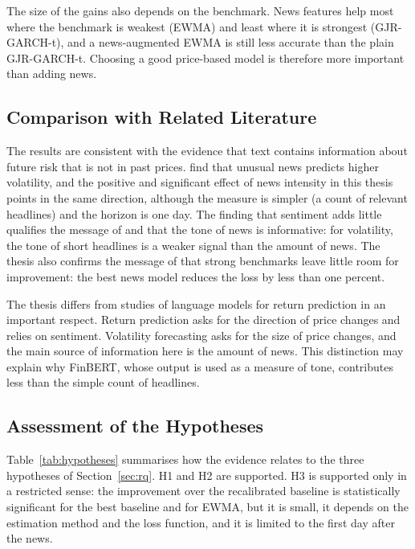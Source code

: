 \documentclass[12pt,a4paper]{article}
\begin{document}
The size of the gains also depends on the benchmark. News features help most where the benchmark is weakest (EWMA) and least where it is strongest (GJR-GARCH-t), and a news-augmented EWMA is still less accurate than the plain GJR-GARCH-t. Choosing a good price-based model is therefore more important than adding news.

\subsection{Comparison with Related Literature}\label{sec:disc-literature}
The results are consistent with the evidence that text contains information about future risk that is not in past prices. \textcite{glasserman2019} find that unusual news predicts higher volatility, and the positive and significant effect of news intensity in this thesis points in the same direction, although the measure is simpler (a count of relevant headlines) and the horizon is one day. The finding that sentiment adds little qualifies the message of \textcite{tetlock2007} and \textcite{loughran2011} that the tone of news is informative: for volatility, the tone of short headlines is a weaker signal than the amount of news. The thesis also confirms the message of \textcite{hansen2005} that strong benchmarks leave little room for improvement: the best news model reduces the loss by less than one percent.

The thesis differs from studies of language models for return prediction \parencite{lopezlira2023} in an important respect. Return prediction asks for the direction of price changes and relies on sentiment. Volatility forecasting asks for the size of price changes, and the main source of information here is the amount of news. This distinction may explain why FinBERT, whose output is used as a measure of tone, contributes less than the simple count of headlines.

\subsection{Assessment of the Hypotheses}\label{sec:disc-hypotheses}
Table~\ref{tab:hypotheses} summarises how the evidence relates to the three hypotheses of Section~\ref{sec:rq}. H1 and H2 are supported. H3 is supported only in a restricted sense: the improvement over the recalibrated baseline is statistically significant for the best baseline and for EWMA, but it is small, it depends on the estimation method and the loss function, and it is limited to the first day after the news.
\end{document}
